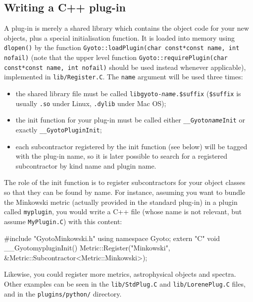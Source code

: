 \documentclass[a4paper,12pt]{article}
\begin{document}
\subsection{Writing a C++ plug-in}
\label{sect:plug-in}

A plug-in is merely a shared library which contains the object code
for your new objects, plus a special initialisation function. It is
loaded into memory using \texttt{dlopen()} by the function
\texttt{Gyoto::loadPlugin(char const*const name, int nofail)} (note
that the upper level function \texttt{Gyoto::requirePlugin(char
  const*const name, int nofail)} should be used instead whenever
applicable), implemented in \texttt{lib/Register.C}. The \texttt{name}
argument will be used three times:
\begin{itemize}
\item the shared library file must be called
  \texttt{libgyoto-\emph{name}.\$suffix} (\texttt{\$suffix} is usually
  \texttt{.so} under Linux, \texttt{.dylib} under Mac OS);
\item the init function for your plug-in must be called either
  \texttt{\_\_Gyoto\emph{name}Init} or exactly
  \texttt{\_\_GyotoPluginInit};
\item each subcontractor registered by the init function (see below)
  will be tagged with the plug-in name, so it is later possible to
  search for a registered subcontractor by kind name and plugin name.
\end{itemize}

The role of the init function is to register subcontractors for your
object classes so that they can be found by name. For instance,
assuming you want to bundle the Minkowski metric (actually provided in
the standard plug-in) in a plugin called \texttt{myplugin}, you would
write a C++ file (whose name is not relevant, but assume
\texttt{MyPlugin.C}) with this content:

\begin{code}
#include "GyotoMinkowski.h"
using namespace Gyoto;
extern "C" void __GyotomypluginInit() {
  Metric::Register("Minkowski", \&Metric::Subcontractor<Metric::Minkowski>);
}
\end{code}

Likewise, you could register more metrics, astrophysical objects and
spectra. Other examples can be seen in the \texttt{lib/StdPlug.C} and
\texttt{lib/LorenePlug.C} files, and in the \texttt{plugins/python/}
directory.
\end{document}

